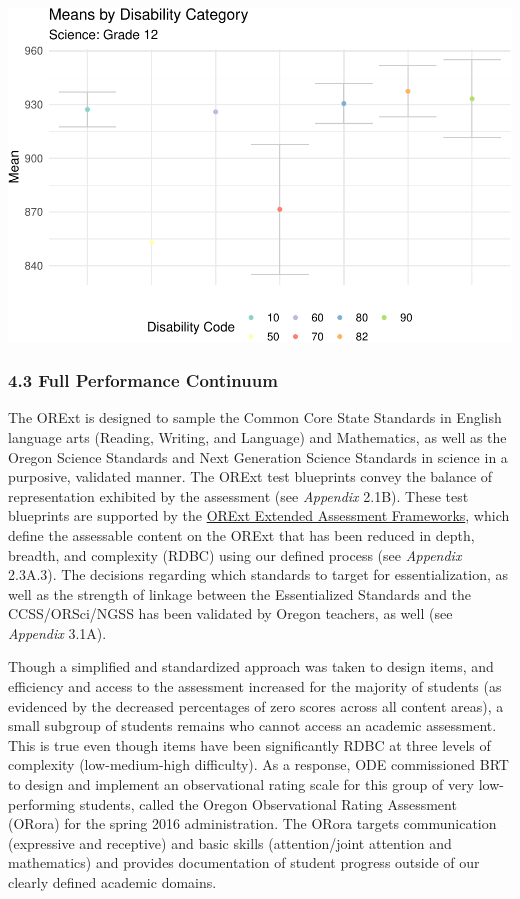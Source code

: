 \documentclass[]{article}
\begin{document}
\includegraphics{Critical_Element_4_files/figure-latex/sci_plots5811-4.pdf}

\hypertarget{full-performance-continuum}{%
\subsubsection{4.3 Full Performance
Continuum}\label{full-performance-continuum}}

The ORExt is designed to sample the Common Core State Standards in
English language arts (Reading, Writing, and Language) and Mathematics,
as well as the Oregon Science Standards and Next Generation Science
Standards in science in a purposive, validated manner. The ORExt test
blueprints convey the balance of representation exhibited by the
assessment (see \emph{Appendix} 2.1B). These test blueprints are
supported by the
\color{link}\href{http://www.brtprojects.org/publications/training-modules}{ORExt
Extended Assessment Frameworks}\color{black}, which define the
assessable content on the ORExt that has been reduced in depth, breadth,
and complexity (RDBC) using our defined process (see \emph{Appendix}
2.3A.3). The decisions regarding which standards to target for
essentialization, as well as the strength of linkage between the
Essentialized Standards and the CCSS/ORSci/NGSS has been validated by
Oregon teachers, as well (see \emph{Appendix} 3.1A).

Though a simplified and standardized approach was taken to design items,
and efficiency and access to the assessment increased for the majority
of students (as evidenced by the decreased percentages of zero scores
across all content areas), a small subgroup of students remains who
cannot access an academic assessment. This is true even though items
have been significantly RDBC at three levels of complexity
(low-medium-high difficulty). As a response, ODE commissioned BRT to
design and implement an observational rating scale for this group of
very low-performing students, called the Oregon Observational Rating
Assessment (ORora) for the spring 2016 administration. The ORora targets
communication (expressive and receptive) and basic skills
(attention/joint attention and mathematics) and provides documentation
of student progress outside of our clearly defined academic domains.
\end{document}
